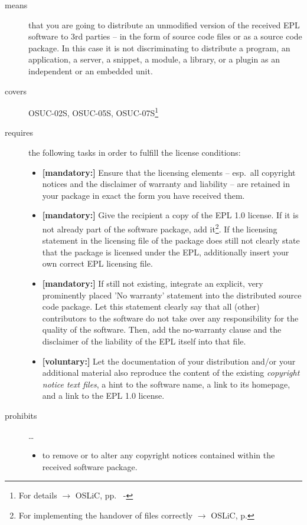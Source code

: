 \begin{description}

\item[means] that you are going to distribute an unmodified version of the
received EPL software to 3rd parties -- in the form of source code files or as a
source code package. In this case it is not discriminating to distribute a
program, an application, a server, a snippet, a module, a library, or a plugin
as an independent or an embedded unit.

\item[covers] OSUC-02S, OSUC-05S, OSUC-07S\footnote{For details $\rightarrow$
OSLiC, pp.\ \pageref{OSUC-02S-DEF} - \pageref{OSUC-07S-DEF}}

\item[requires] the following tasks in order to fulfill the license conditions:
\begin{itemize}
  
  \item \textbf{[mandatory:]} Ensure that the licensing elements -- esp.\ all
  copyright notices and the disclaimer of warranty and liability -- are retained
  in your package in exact the form you have received them.
  
  \item \textbf{[mandatory:]} Give the recipient a copy of the EPL 1.0 license.
  If it is not already part of the software package, add it\footnote{For
  implementing the handover of files correctly $\rightarrow$ OSLiC, p.
  \pageref{DistributingFilesHint}}. If the licensing statement in the licensing
  file of the package does still not clearly state that the package is licensed
  under the EPL, additionally insert your own correct EPL licensing file.
  
  \item \textbf{[mandatory:]} If still not existing, integrate an explicit, very
  prominently placed 'No warranty' statement into the distributed source code
  package. Let this statement clearly say that all (other) contributors to the
  software do not take over any responsibility for the quality of the software.
  Then, add the no-warranty clause and the disclaimer of the liability of the
  EPL itself into that file.
  
  \item \textbf{[voluntary:]} Let the documentation of your distribution and/or
  your additional material also reproduce the content of the existing
  \emph{copyright notice text files}, a hint to the software name, a link to its
  homepage, and a link to the EPL 1.0 license.
\end{itemize}

\item[prohibits] \ldots
\begin{itemize}
  \item to remove or to alter any copyright notices contained within the
  received software package.
\end{itemize}

\end{description}


